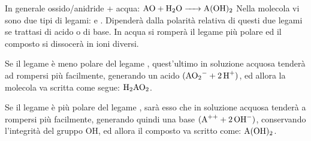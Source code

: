 In generale ossido/anidride + acqua:
\(\ce{AO + H_2O -> A(OH)_2}\)
Nella molecola vi sono due tipi di legami:  e . Dipenderà dalla polarità relativa di questi due legami se trattasi di acido o di base. In acqua si romperà il legame più polare ed il composto si dissocerà in ioni diversi.

Se il legame  è meno polare del legame , quest'ultimo in soluzione acquosa tenderà ad rompersi più facilmente, generando un acido \(\ce{(AO_2- + 2H+)}\), ed allora la molecola va scritta come segue: \(\ce{H_2AO_2}\).

Se il legame  è più polare del legame , sarà esso che in soluzione acquosa tenderà a rompersi più facilmente, generando quindi una base \(\ce{(A++ + 2OH^-)}\), conservando l’integrità del gruppo OH, ed allora il composto va scritto come: $\rm A(OH)_2$.
